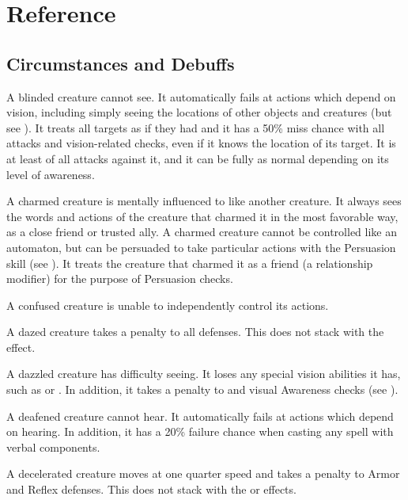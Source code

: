 \chapter{Reference}\label{Reference}

\section{Circumstances and Debuffs}\label{Circumstances and Debuffs}

 A blinded creature cannot see.
It automatically fails at actions which depend on vision, including simply seeing the locations of other objects and creatures (but see ).
It treats all targets as if they had  and it has a 50\% miss chance with all attacks and vision-related checks, even if it knows the location of its target.
It is at least \partiallyunaware of all attacks against it, and it can be fully \unaware as normal depending on its level of awareness.

 A charmed creature is mentally influenced to like another creature.
It always sees the words and actions of the creature that charmed it in the most favorable way, as a close friend or trusted ally.
A charmed creature cannot be controlled like an automaton, but can be persuaded to take particular actions with the Persuasion skill (see ).
It treats the creature that charmed it as a friend (a  relationship modifier) for the purpose of Persuasion checks.

 A confused creature is unable to independently control its actions. \confusionexplanation

 A dazed creature takes a  penalty to all defenses.
This does not stack with the \stunned effect.

 A dazzled creature has difficulty seeing.
It loses any special vision abilities it has, such as  or .
In addition, it takes a  penalty to  and visual Awareness checks (see ).

 A deafened creature cannot hear. It automatically fails at actions which depend on hearing. In addition, it has a 20\% failure chance when casting any spell with verbal components.

 A decelerated creature moves at one quarter speed and takes a  penalty to Armor and Reflex defenses.
This does not stack with the \slowed or \immobilized effects.

